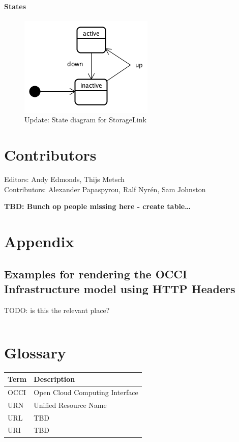 \documentclass[10pt,a4paper]{article}
\begin{document}
\paragraph{States}
\begin{figure}[!h]
	\centering
	\includegraphics[scale=0.4]{figs/network-state.png}
	\caption{Update: State diagram for StorageLink}
	\label{fig:storagelink_state}
\end{figure}

\section{Contributors}

Editors: Andy Edmonds, Thijs Metsch \\
Contributors: Alexander Papaspyrou, Ralf Nyr\'en, Sam Johnston

\textbf{TBD: Bunch op people missing here - create table\ldots}

\section{Appendix}

\subsection{Examples for rendering the OCCI Infrastructure model using HTTP Headers}
TODO: is this the relevant place?

\begin{verbatim}

\end{verbatim}

\section{Glossary}

\begin{tabular}{l|l}
Term & Description \\
\hline
OCCI & Open Cloud Computing Interface \\
URN & Unified Resource Name \\
URL & TBD \\
URI & TBD \\
\end{tabular}
\end{document}
